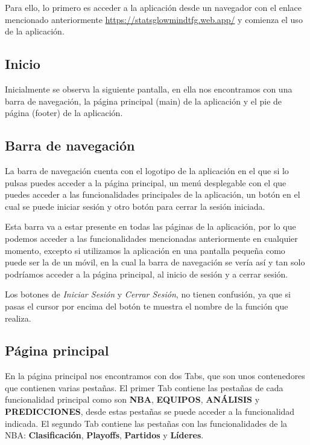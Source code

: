 Para ello, lo primero es acceder a la aplicación desde un navegador con el enlace mencionado anteriormente \url{https://statsglowmindtfg.web.app/} y comienza el uso de la aplicación.

\subsection{Inicio}

Inicialmente se observa la siguiente pantalla, en ella nos encontramos con una barra de navegación, la página principal (main) de la aplicación y el pie de página (footer) de la aplicación.


\subsection{Barra de navegación}

La barra de navegación cuenta con el logotipo de la aplicación en el que si lo pulsas puedes acceder a la página principal, un menú desplegable con el que puedes acceder a las funcionalidades principales de la aplicación, un botón en el cual se puede iniciar sesión y otro botón para cerrar la sesión iniciada.


Esta barra va a estar presente en todas las páginas de la aplicación, por lo que podemos acceder a las funcionalidades mencionadas anteriormente en cualquier momento, excepto si utilizamos la aplicación en una pantalla pequeña como puede ser la de un móvil, en la cual la barra de navegación se vería así y tan solo podríamos acceder a la página principal, al inicio de sesión y a cerrar sesión.


Los botones de \textit{Iniciar Sesión} y \textit{Cerrar Sesión}, no tienen confusión, ya que si pasas el cursor por encima del botón te muestra el nombre de la función que realiza.


\subsection{Página principal}

En la página principal nos encontramos con dos Tabs, que son unos contenedores que contienen varias pestañas. El primer Tab contiene las pestañas de cada funcionalidad principal como son \textbf{NBA}, \textbf{EQUIPOS}, \textbf{ANÁLISIS} y \textbf{PREDICCIONES}, desde estas pestañas se puede acceder a la funcionalidad indicada. El segundo Tab contiene las pestañas con las funcionalidades de la NBA: \textbf{Clasificación}, \textbf{Playoffs}, \textbf{Partidos} y \textbf{Líderes}.

